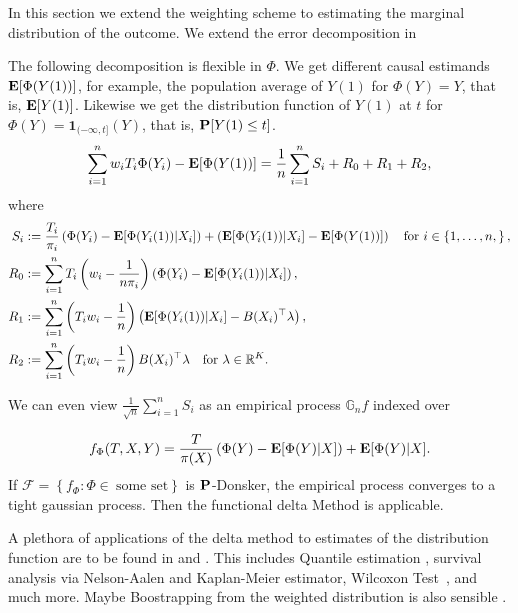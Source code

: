 In this section we extend the weighting scheme to estimating the marginal distribution of the outcome.
We extend the error decomposition in \cite[page 27]{Wang2019}

The following decomposition is flexible in $\Phi.$
We get different causal estimands $\E[\Phi(Y(1))]$,
for example, 
the population average of $Y(1)$
for 
$
  \Phi(Y)=Y
$, that is,
$
\E[Y(1)]
$.
Likewise we get the distribution function of $Y(1)$ at $t$
for 
$
  \Phi(Y)=
  \mathbf{1}_{(-\infty, t]}
  (Y)
$,
that is,
$
\P[
Y(1)\le t
]
$.
\begin{gather}
 \sum_{i=1}^{n}  
 w_i
 T_i
 \Phi(Y_i)
  - \E [ \Phi(Y(1)) ]
  =
  \frac{1}{n}
  \sum_{ i = 1 }^{n} S_i
    + R_0
    + R_1
    + R_2
    ,
\end{gather}
where
\begin{align*}
  S_i 
  &:= 
  \frac{T_i}{\pi_i}
 \left( 
   \Phi(Y_i) - \E [ \Phi(Y_i(1)) | X_i ]
 \right)
 +
 \left( 
   \E [ \Phi(Y_i(1)) | X_i ] - \E [ \Phi(Y(1))]
 \right)
 \quad
 \text{for}\ 
 i \in \left\{ 1, \ldots, n, \right\}
 ,
 \\
  R_0
  &:=
  \sum_{ i = 1 }^{n}
  T_i
    \left(  
      w_i - \frac{1}{n \pi_i}
    \right)
 \left( 
   \Phi(Y_i) - \E [ \Phi(Y_i(1)) | X_i ]
 \right)
 ,\\
  R_1
  &:=
  \sum_{ i = 1 }^{n}
    \left(  
      T_i
      w_i - \frac{1}{n}
    \right)
 \left( 
    \E [ \Phi(Y_i(1)) | X_i ] - B(X_i)^\top \lambda
 \right)
 ,
 \\
  R_2
  &:=
  \sum_{ i = 1 }^{n}
    \left(  
      T_i
      w_i - \frac{1}{n}
    \right)
 B(X_i)^\top \lambda
 \quad 
 \text{for}
 \ 
 \lambda \in \R^K
 .
\end{align*}

We can even view
$
\frac{1}{\sqrt{n}}
\sum_{i=1}^{n}S_i 
$
as an empirical process 
$
\mathbb{G}_n f
$
indexed over 

\begin{gather}
  f_\Phi(T,X,Y)
  =
  \frac{T}{\pi(X)}
 \left( 
   \Phi(Y) - \E [ \Phi(Y) | X ]
 \right)
 +
   \E [ \Phi(Y) | X ] 
   .
\end{gather}
If $\mathcal{F}=\left\{ f_\Phi \colon \Phi \in \ \text{some set}\right\}$
is $\P$-Donsker, the empirical process converges to a tight gaussian process.
Then the functional delta Method is applicable.

A plethora of applications of the delta method to estimates of the distribution function are to be found in \cite{Vaart2000} and \cite{vaart2013}.
This includes Quantile estimation \cite[§21]{Vaart2000}\cite[§3.9.21/24]{vaart2013},
survival analysis via Nelson-Aalen and Kaplan-Meier estimator\cite[§3.9.19/31]{vaart2013},
Wilcoxon Test~\cite[§3.9.4.1]{vaart2013},
and much more.
Maybe Boostrapping from the weighted distribution is also sensible .
